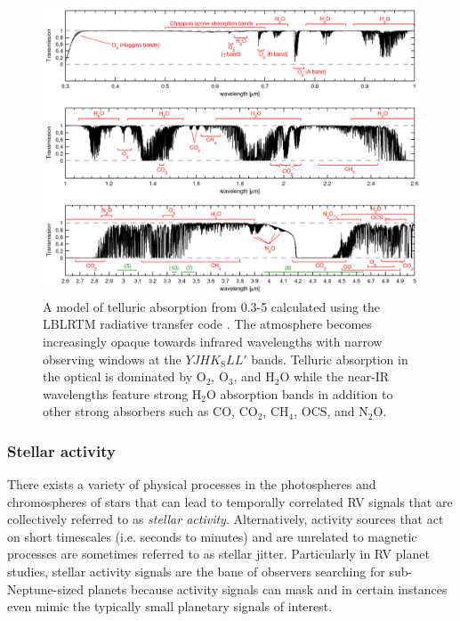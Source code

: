 \begin{figure}
  \centering
  \includegraphics[width=0.8\hsize]{figures/transmittancev2.png}
  \caption[Atmospheric transmission from 0.3-5 $\mu$m.]
          {A model of telluric absorption from 0.3-5 \micron{} calculated using the LBLRTM radiative transfer
            code \citep{clough05}. The atmosphere becomes increasingly opaque towards infrared wavelengths with
            narrow observing windows at the $YJHK_{\text{S}}LL'$ bands. Telluric absorption in the optical is
            dominated by O$_2$, O$_3$, and H$_2$O while the near-IR wavelengths feature strong H$_2$O absorption
            bands in addition to other strong absorbers such as CO, CO$_2$, CH$_4$, OCS, and N$_2$O.
            \citep[Image credit:][]{smette15}}
  \label{fig:transmission}
\end{figure}

\subsubsection{Stellar activity} \label{sect:activity}
There exists a variety of physical processes in the photospheres and chromospheres of stars that
can lead to temporally correlated RV signals that are collectively
referred to as \emph{stellar activity}. Alternatively, activity sources that act on short timescales
(i.e. seconds to minutes) and are unrelated to magnetic processes are sometimes referred to as stellar jitter.
Particularly in RV planet studies, stellar activity
signals are the bane of observers searching for sub-Neptune-sized planets because activity signals
can mask and in certain instances even mimic the typically small planetary signals of interest. \\

